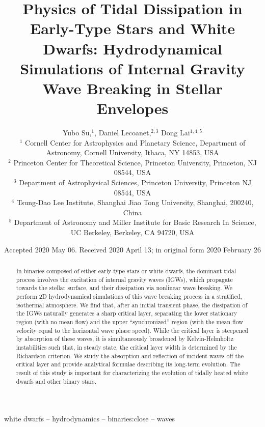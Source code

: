 \documentclass[
        fleqn,
        usenatbib,
    ]{mnras}
\title[Physics of Tidal Dissipation]{Physics of Tidal Dissipation in Early-Type
Stars and White Dwarfs: Hydrodynamical Simulations of Internal Gravity Wave
Breaking in Stellar Envelopes}
\author[Y. Su et\ al.]{
Yubo Su,$^1$,
Daniel Lecoanet,$^{2,3}$
Dong Lai$^{1,4, 5}$
\\
$^1$ Cornell Center for Astrophysics and Planetary Science, Department of
Astronomy, Cornell University, Ithaca, NY 14853, USA
\\
$^2$ Princeton Center for Theoretical Science, Princeton University, Princeton,
NJ 08544, USA
\\
$^3$ Department of Astrophysical Sciences, Princeton University, Princeton NJ
08544, USA
\\
$^4$ Tsung-Dao Lee Institute, Shanghai Jiao Tong University, Shanghai, 200240,
China
\\
$^5$ Department of Astronomy and Miller Institute for Basic Research In Science,
UC Berkeley, Berkeley, CA 94720, USA
}
\date{Accepted 2020 May 06. Received 2020 April 13; in original form 2020
February 26}
\begin{document}
\label{firstpage}
\pagerange{\pageref{firstpage}--\pageref{lastpage}}
\maketitle


\begin{abstract}
    In binaries composed of either early-type stars or white
    dwarfs, the dominant tidal process involves the excitation of internal
    gravity waves (IGWs), which propagate towards the stellar surface, and their
    dissipation via nonlinear wave breaking. We perform 2D hydrodynamical
    simulations of this wave breaking process in a stratified, isothermal
    atmosphere. We find that, after an initial transient phase, the dissipation
    of the IGWs naturally generates a sharp critical layer, separating the lower
    stationary region (with no mean flow) and the upper ``synchronized'' region
    (with the mean flow velocity equal to the horizontal wave phase speed).
    While the critical layer is steepened by absorption of these waves, it is
    simultaneously broadened by Kelvin-Helmholtz instabilities such that, in
    steady state, the critical layer width is determined by the Richardson
    criterion. We study the absorption and reflection of incident waves off the
    critical layer and provide analytical formulae describing its long-term
    evolution. The result of this study is important for characterizing the
    evolution of tidally heated white dwarfs and other binary stars.
\end{abstract}

\begin{keywords}
white dwarfs -- hydrodynamics -- binaries:close -- waves %
\end{keywords}
\end{document}
